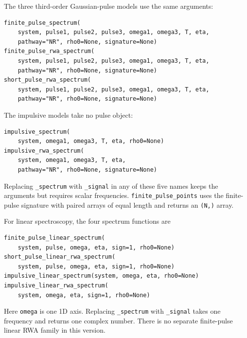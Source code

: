 The three third-order Gaussian-pulse models use the same arguments:
\par\noindent
\begin{minipage}{\linewidth}
\begin{lstlisting}[style=python]
finite_pulse_spectrum(
    system, pulse1, pulse2, pulse3, omega1, omega3, T, eta,
    pathway="NR", rho0=None, signature=None)
finite_pulse_rwa_spectrum(
    system, pulse1, pulse2, pulse3, omega1, omega3, T, eta,
    pathway="NR", rho0=None, signature=None)
short_pulse_rwa_spectrum(
    system, pulse1, pulse2, pulse3, omega1, omega3, T, eta,
    pathway="NR", rho0=None, signature=None)
\end{lstlisting}
\end{minipage}\par
The impulsive models take no pulse object:
\par\noindent
\begin{minipage}{\linewidth}
\begin{lstlisting}[style=python]
impulsive_spectrum(
    system, omega1, omega3, T, eta, rho0=None)
impulsive_rwa_spectrum(
    system, omega1, omega3, T, eta,
    pathway="NR", rho0=None, signature=None)
\end{lstlisting}
\end{minipage}\par
Replacing \texttt{\_spectrum} with \texttt{\_signal} in any of these
five names keeps the arguments but requires scalar frequencies.
\texttt{finite\_pulse\_points} uses the finite-pulse signature with
paired arrays of equal length and returns an \texttt{(N,)} array.

For linear spectroscopy, the four spectrum functions are
\par\noindent
\begin{minipage}{\linewidth}
\begin{lstlisting}[style=python]
finite_pulse_linear_spectrum(
    system, pulse, omega, eta, sign=1, rho0=None)
short_pulse_linear_rwa_spectrum(
    system, pulse, omega, eta, sign=1, rho0=None)
impulsive_linear_spectrum(system, omega, eta, rho0=None)
impulsive_linear_rwa_spectrum(
    system, omega, eta, sign=1, rho0=None)
\end{lstlisting}
\end{minipage}\par
Here \texttt{omega} is one 1D axis. Replacing \texttt{\_spectrum} with
\texttt{\_signal} takes one frequency and returns one complex number.
There is no separate finite-pulse linear RWA family in this version.

